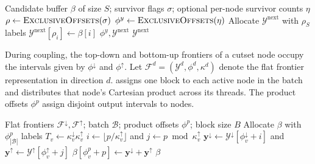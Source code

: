 \documentclass[letterpaper]{article}
\begin{document}
\begin{algorithm}[htbp!]
\caption{Compact GPU Node Frontiers}
\label{alg:compact_survivors}
\begin{algorithmic}[1]
\Require Candidate buffer $\beta$ of size $S$; survivor flags $\sigma$; optional per-node survivor counts $\eta$
    \State $\rho\gets\Call{ExclusiveOffsets}{\sigma}$
        \State $\phi^y\gets\Call{ExclusiveOffsets}{\eta}$
    \EndIf
    \State Allocate $\mathcal{Y}^{\mathrm{next}}$ with $\rho_S$ labels
            \State $\mathcal{Y}^{\mathrm{next}}[\rho_i]\gets\beta[i]$
        \EndIf
    \EndFor
        \State \Return $\phi^y,\mathcal{Y}^{\mathrm{next}}$
    \EndIf
    \State \Return $\mathcal{Y}^{\mathrm{next}}$
\EndProcedure
\end{algorithmic}
\end{algorithm}

During coupling, the top-down and bottom-up frontiers of a cutset node occupy the intervals given by $\phi^{\downarrow}$ and $\phi^{\uparrow}$. Let $\mathcal{F}^d=(\mathcal{Y}^d,\phi^d,\kappa^d)$ denote the flat frontier representation in direction $d$.  assigns one block to each active node in the batch and distributes that node's Cartesian product across its threads. The product offsets $\phi^p$ assign disjoint output intervals to nodes.

\begin{algorithm}[htbp!]
\caption{Materialize GPU Cutset Products}
\label{alg:materialize_cutset_products}
\begin{algorithmic}[1]
\Require Flat frontiers $\mathcal{F}^{\downarrow},\mathcal{F}^{\uparrow}$; batch $\mathcal{B}$; product offsets $\phi^p$; block size $B$
    \State Allocate $\beta$ with $\phi^p_{|\mathcal{B}|}$ labels
        \State $T_v\gets\kappa_v^{\downarrow}\kappa_v^{\uparrow}$
            \State $i\gets\lfloor p/\kappa_v^{\uparrow}\rfloor$ and
            $j\gets p\bmod\kappa_v^{\uparrow}$
            \State $\mathbf{y}^{\downarrow}\gets
            \mathcal{Y}^{\downarrow}[\phi_v^{\downarrow}+i]$ and
            $\mathbf{y}^{\uparrow}\gets
            \mathcal{Y}^{\uparrow}[\phi_v^{\uparrow}+j]$
            \State $\beta[\phi^p_v+p]\gets
            \mathbf{y}^{\downarrow}+\mathbf{y}^{\uparrow}$
        \EndFor
    \EndFor
    \State \Return $\beta$
\EndProcedure
\end{algorithmic}
\end{algorithm}
\FloatBarrier
\end{document}

